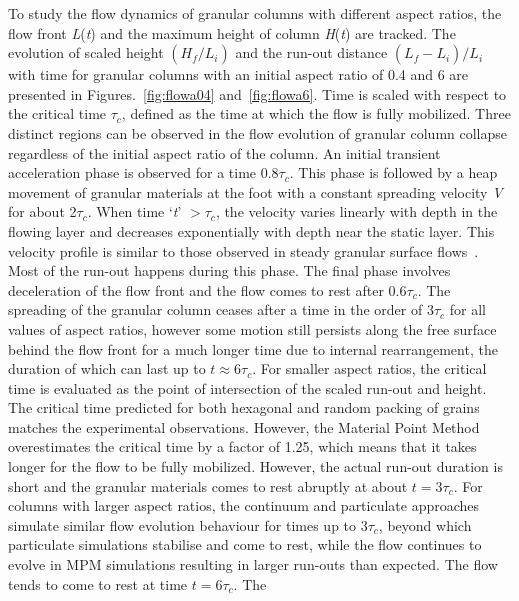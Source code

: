 To study the flow dynamics of granular columns with different aspect ratios, 
the flow front \textit{L}(\textit{t}) and the maximum height of column 
\textit{H}(\textit{t}) are tracked. The evolution of scaled height 
$(H_{\textit{f}}/L_{\textit{i}})$ and the run-out distance 
$(L_{\textit{f}}-L_{\textit{i}})/L_{\textit{i}}$ with time for granular columns 
with an initial aspect ratio of 0.4 and 6 are presented in 
Figures.~\cref{fig:flowa04} and~\cref{fig:flowa6}. Time is scaled with respect 
to 
the critical time $\tau_{c}$, defined as the time at which the flow is fully 
mobilized. Three distinct regions can be observed in the flow evolution of 
granular column collapse regardless of the initial aspect ratio of the column. 
An initial transient acceleration phase is observed for a time 0.8$\tau_{c}$. 
This phase is followed by a heap movement of granular materials at the foot 
with a constant spreading velocity \textit{V} for about 2$\tau_{c}$. When time 
`\textit{t}' $> \tau_{c}$, the velocity varies linearly with depth in the 
flowing layer and decreases exponentially with depth near the static layer. 
This velocity profile is similar to those observed in steady granular surface 
flows~\citep{Lajeunesse2004}. Most of the run-out happens during this phase. 
The final phase involves deceleration of the flow front and the flow comes to 
rest after 0.6$\tau_{c}$. The spreading of the granular column ceases after a 
time in the order of 3$\tau_{c}$ for all values of aspect ratios, however some 
motion still persists along the free surface behind the flow front for a much 
longer time due to internal rearrangement, the duration of which can last up to 
$\textit{t} \approx 6\tau_{c}$. For smaller aspect ratios, the critical time is 
evaluated as the point of intersection of the scaled run-out and height. The 
critical time predicted for both hexagonal and random packing of grains matches 
the experimental observations. However, the Material Point Method overestimates 
the critical time by a factor of 1.25, which means that it takes longer for the 
flow to be fully mobilized. However, the actual run-out duration is short and 
the granular materials comes to rest abruptly at about $\textit{t}=3\tau_{c}$. 
For columns with larger aspect ratios, the continuum and particulate approaches 
simulate similar flow evolution behaviour for times up to 3$\tau_{c}$, beyond 
which particulate simulations stabilise and come to rest, while the flow 
continues to evolve in MPM simulations resulting in larger run-outs than 
expected. The flow tends to come to rest at time $\textit{t}=6\tau_{c}$. The 
